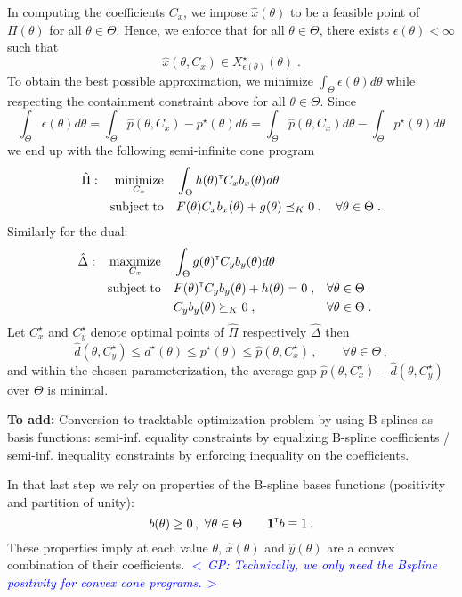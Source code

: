 \documentclass{article}
\renewcommand{\t}{^{\mbox{\tiny \sf T}}}    %
\newcommand{\ppar}{\theta}                  %
\newcommand{\Ppar}{\Theta}                  %
\DeclareMathOperator*{\minimize}{minimize}
\DeclareMathOperator*{\maximize}{maximize}
\DeclareMathOperator*{\subj}{subject\;to}
\newcommand{\commentGP}[1]{\noindent \textcolor{blue}{\emph{$<\,$GP: #1$\,>$}}}%
\begin{document}
In computing the coefficients $C_x$, we impose $\hat{x}(\ppar)$ to be a feasible point of $\Pi(\ppar)$ for all $\ppar\in\Ppar$. Hence, we enforce that for all $\ppar\in\Ppar$, there exists $\epsilon(\ppar)<\infty$ such that
\[ \hat{x}(\ppar, C_x) \in X^\star_{\epsilon(\ppar)}(\ppar) \;.
\]
To obtain the best possible approximation, we minimize $\int_{\Ppar}\epsilon(\ppar)d\ppar$ while respecting the containment constraint above for all $\ppar\in\Ppar$. Since
\[ \int_{\Ppar}\epsilon(\ppar)d\ppar = \int_{\Ppar}\hat{p}(\ppar, C_x)-p^\star(\ppar)d\ppar = \int_{\Ppar}\hat{p}(\ppar,C_x)d\ppar-\int_{\Ppar}p^\star(\ppar)d\ppar%
\]
we end up with the following semi-infinite cone program
\begin{gather}\label{eq:semi-inf_primal}
\begin{aligned}
\hat{\Pi}: && \minimize_{C_x} &&& \int_{\Ppar} h(\ppar)\t  C_x b_x(\ppar) d\ppar\\%
           && \subj           &&& F(\ppar) C_x b_x(\ppar)+g(\ppar)\preceq_K 0 \;, \quad\forall\ppar\in\Ppar\;.%
\end{aligned}
\end{gather}
Similarly for the dual:
\begin{gather}\label{eq:semi-inf_dual}
\begin{aligned}
\hat{\Delta}: && \maximize_{C_x} &&& \int_{\Ppar} g(\ppar)\t  C_y b_y(\ppar) d\ppar\\%
              && \subj           &&& F(\ppar)\t  C_y b_y(\ppar) + h(\ppar)= 0 \;, &&\forall\ppar\in\Ppar\\%
              &&                 &&&  C_y b_y(\ppar)\succeq_K 0  \;, &&\forall\ppar\in\Ppar\;.%
\end{aligned}
\end{gather}
Let $C_x^\star$ and $C_y^\star$ denote optimal points of $\hat{\Pi}$ respectively $\hat{\Delta}$ then
\[ \hat{d}(\ppar,C_y^\star) \leq d^\star(\ppar) \leq p^\star(\ppar) \leq \hat{p}(\ppar,C_x^\star)\,,\qquad\forall\ppar\in\Ppar\,,%
\]
and within the chosen parameterization, the average gap $\hat{p}(\ppar,C_x^\star)-\hat{d}(\ppar,C_y^\star)$ over $\Ppar$ is minimal.

\vspace*{12pt}
\noindent\textbf{To add:} Conversion to tracktable optimization problem by using B-splines as basis functions: semi-inf. equality constraints by equalizing B-spline coefficients / semi-inf. inequality constraints by enforcing inequality on the coefficients.

In that last step we rely on properties of the B-spline bases functions (positivity and partition of unity):
\[ b(\ppar)\geq0\,,~\forall\ppar\in\Ppar \qquad \mathbf{1}\t b \equiv 1\,.%
\]
These properties imply at each value $\ppar$, $\hat{x}(\ppar)$ and $\hat{y}(\ppar)$ are a convex combination of their coefficients. \commentGP{Technically, we only need the Bspline positivity for convex cone programs.}
\end{document}
